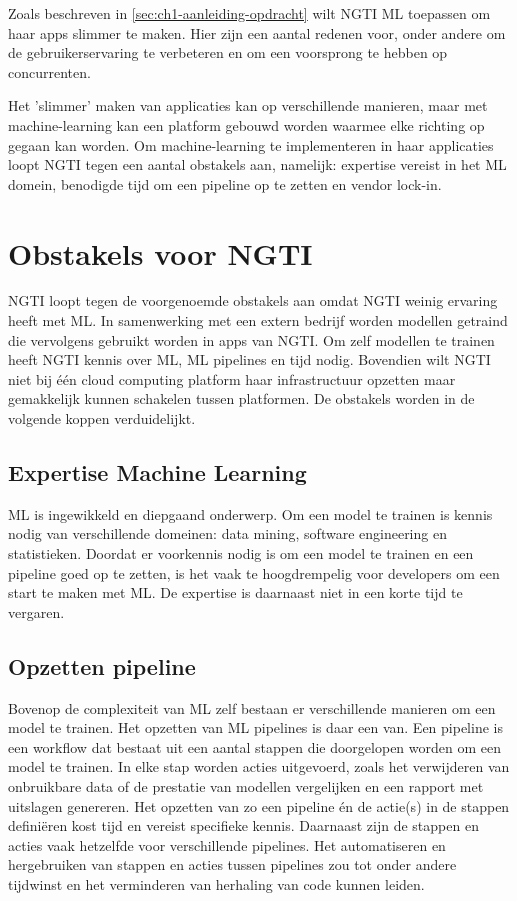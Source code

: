 Zoals beschreven in \autoref{sec:ch1-aanleiding-opdracht} wilt NGTI ML toepassen om haar apps slimmer te maken. Hier zijn een aantal redenen voor, onder andere om de gebruikerservaring te verbeteren en om een voorsprong te hebben op concurrenten.

Het 'slimmer' maken van applicaties kan op verschillende manieren, maar met machine-learning kan een platform gebouwd worden waarmee elke richting op gegaan kan worden. Om machine-learning te implementeren in haar applicaties loopt NGTI tegen een aantal obstakels aan, namelijk: expertise vereist in het ML domein, benodigde tijd om een pipeline op te zetten en vendor lock-in.

\section{Obstakels voor NGTI}\label{sec:ch2-obstakels-voor-ngti}
NGTI loopt tegen de voorgenoemde obstakels aan omdat NGTI weinig ervaring heeft met ML. In samenwerking met een extern bedrijf worden modellen getraind die vervolgens gebruikt worden in apps van NGTI. Om zelf modellen te trainen heeft NGTI kennis over ML, ML pipelines en tijd nodig. Bovendien wilt NGTI niet bij één cloud computing platform haar infrastructuur opzetten maar gemakkelijk kunnen schakelen tussen platformen. De obstakels worden in de volgende koppen verduidelijkt.

\subsection{Expertise Machine Learning}\label{subsec:ch2-expertise-machine-learning}
ML is ingewikkeld en diepgaand onderwerp. Om een model te trainen is kennis nodig van verschillende domeinen: data mining, software engineering en statistieken. Doordat er voorkennis nodig is om een model te trainen en een pipeline goed op te zetten, is het vaak te hoogdrempelig voor developers om een start te maken met ML. De expertise is daarnaast niet in een korte tijd te vergaren.

\subsection{Opzetten pipeline}\label{subsec:ch2-opzetten-pipeline}
Bovenop de complexiteit van ML zelf bestaan er verschillende manieren om een model te trainen. Het opzetten van ML pipelines is daar een van. Een pipeline is een workflow dat bestaat uit een aantal stappen die doorgelopen worden om een model te trainen. In elke stap worden acties uitgevoerd, zoals het verwijderen van onbruikbare data of de prestatie van modellen vergelijken en een rapport met uitslagen genereren. Het opzetten van zo een pipeline én de actie(s) in de stappen definiëren kost tijd en vereist specifieke kennis. Daarnaast zijn de stappen en acties vaak hetzelfde voor verschillende pipelines. Het automatiseren en hergebruiken van stappen en acties tussen pipelines zou tot onder andere tijdwinst en het verminderen van herhaling van code kunnen leiden.

